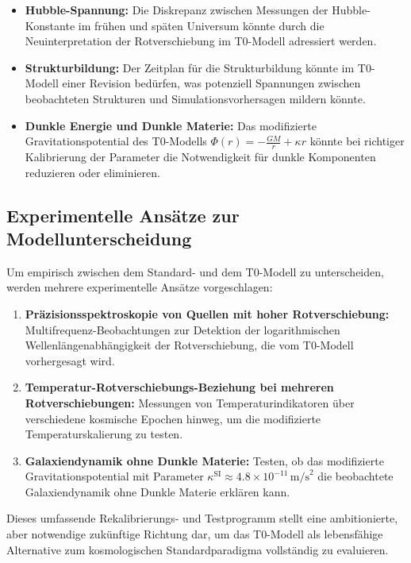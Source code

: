\documentclass[12pt,a4paper]{article}
\begin{document}
	\begin{itemize}
		\item \textbf{Hubble-Spannung:} Die Diskrepanz zwischen Messungen der Hubble-Konstante im frühen und späten Universum könnte durch die Neuinterpretation der Rotverschiebung im T0-Modell adressiert werden.
		
		\item \textbf{Strukturbildung:} Der Zeitplan für die Strukturbildung könnte im T0-Modell einer Revision bedürfen, was potenziell Spannungen zwischen beobachteten Strukturen und Simulationsvorhersagen mildern könnte.
		
		\item \textbf{Dunkle Energie und Dunkle Materie:} Das modifizierte Gravitationspotential des T0-Modells $\Phi(r) = -\frac{GM}{r} + \kappa r$ könnte bei richtiger Kalibrierung der Parameter die Notwendigkeit für dunkle Komponenten reduzieren oder eliminieren.
	\end{itemize}
	
	\subsection{Experimentelle Ansätze zur Modellunterscheidung}
	\label{subsec:model_discrimination}
	
	Um empirisch zwischen dem Standard- und dem T0-Modell zu unterscheiden, werden mehrere experimentelle Ansätze vorgeschlagen:
	
	\begin{enumerate}
		\item \textbf{Präzisionsspektroskopie von Quellen mit hoher Rotverschiebung:} Multifrequenz-Beobachtungen zur Detektion der logarithmischen Wellenlängenabhängigkeit der Rotverschiebung, die vom T0-Modell vorhergesagt wird.
		
		\item \textbf{Temperatur-Rotverschiebungs-Beziehung bei mehreren Rotverschiebungen:} Messungen von Temperaturindikatoren über verschiedene kosmische Epochen hinweg, um die modifizierte Temperaturskalierung zu testen.
		
		\item \textbf{Galaxiendynamik ohne Dunkle Materie:} Testen, ob das modifizierte Gravitationspotential mit Parameter $\kappa^{\text{SI}} \approx 4.8 \times 10^{-11} \, \text{m/s}^2$ die beobachtete Galaxiendynamik ohne Dunkle Materie erklären kann.
	\end{enumerate}
	
	Dieses umfassende Rekalibrierungs- und Testprogramm stellt eine ambitionierte, aber notwendige zukünftige Richtung dar, um das T0-Modell als lebensfähige Alternative zum kosmologischen Standardparadigma vollständig zu evaluieren.
	
\end{document}
